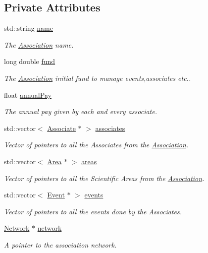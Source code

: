 \subsection*{Private Attributes}
\begin{DoxyCompactItemize}
\item 
std\+::string \hyperlink{classAssociation_a165477d8d99c99a659d2f193b39ba1f8}{name}
\begin{DoxyCompactList}\small\item\em The \hyperlink{classAssociation}{Association} name. \end{DoxyCompactList}\item 
long double \hyperlink{classAssociation_a891f18ca3dbbbdfa2e8fab54b1683133}{fund}
\begin{DoxyCompactList}\small\item\em The \hyperlink{classAssociation}{Association} initial fund to manage events,associates etc.. \end{DoxyCompactList}\item 
float \hyperlink{classAssociation_a19f8a7aad1491bc14f558b0b852da0a4}{annual\+Pay}
\begin{DoxyCompactList}\small\item\em The annual pay given by each and every associate. \end{DoxyCompactList}\item 
std\+::vector$<$ \hyperlink{classAssociate}{Associate} $\ast$ $>$ \hyperlink{classAssociation_a9b350d7abc7358f9bd8476438df89792}{associates}
\begin{DoxyCompactList}\small\item\em Vector of pointers to all the Associates from the \hyperlink{classAssociation}{Association}. \end{DoxyCompactList}\item 
std\+::vector$<$ \hyperlink{classArea}{Area} $\ast$ $>$ \hyperlink{classAssociation_a6e0125297a1927aae76d14710fc02862}{areas}
\begin{DoxyCompactList}\small\item\em Vector of pointers to all the Scientific Areas from the \hyperlink{classAssociation}{Association}. \end{DoxyCompactList}\item 
std\+::vector$<$ \hyperlink{classEvent}{Event} $\ast$ $>$ \hyperlink{classAssociation_aaf2b66c89b34895285a108658336df51}{events}
\begin{DoxyCompactList}\small\item\em Vector of pointers to all the events done by the Associates. \end{DoxyCompactList}\item 
\hyperlink{classNetwork}{Network} $\ast$ \hyperlink{classAssociation_a6747cedd4ce14a3b890c8ac87f676192}{network}
\begin{DoxyCompactList}\small\item\em A pointer to the association network. \end{DoxyCompactList}\end{DoxyCompactItemize}
